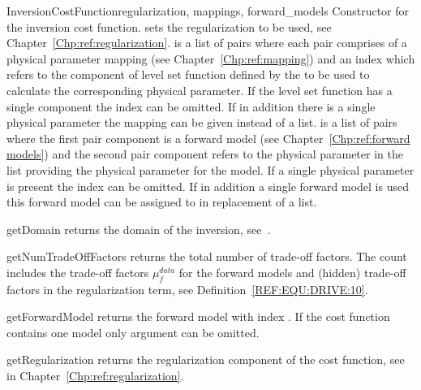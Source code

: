 \begin{classdesc}{InversionCostFunction}{regularization, mappings, forward_models}
Constructor for the inversion cost function.  sets the regularization to be used, see Chapter~\ref{Chp:ref:regularization}.
 is a list of pairs where each pair comprises of a 
physical parameter mapping (see Chapter~\ref{Chp:ref:mapping}) and an index which refers to the component of level set function
defined by the  to be used to calculate the corresponding physical parameter.
If the level set function has a single component the index can be omitted.
If in addition there is a single physical parameter the mapping can be given instead of a list.
 is a list of pairs where the first pair component is a
forward model (see Chapter~\ref{Chp:ref:forward models}) and the second pair
component refers to the physical parameter in the  list
providing the physical parameter for the model.
If a single physical parameter is present the index can be omitted.
If in addition a single forward model is used this forward model can be
assigned to  in replacement of a list.
\end{classdesc}

\begin{methoddesc}[InversionCostFunction]{getDomain}{}
returns the \escript domain of the inversion, see~\cite{ESCRIPT}.
\end{methoddesc}
        
\begin{methoddesc}[InversionCostFunction]{getNumTradeOffFactors}{}
returns the total number of trade-off factors.
The count includes the trade-off factors $\mu^{data}_{f}$ for the forward
models and (hidden) trade-off factors in the regularization term,
see Definition~\ref{REF:EQU:DRIVE:10}.
\end{methoddesc}

\begin{methoddesc}[InversionCostFunction]{getForwardModel}{}
returns the forward model with index .
If the cost function contains one model only argument  can be omitted.
\end{methoddesc}
        
\begin{methoddesc}[InversionCostFunction]{getRegularization}{}
returns the regularization component of the cost function, see  in Chapter~\ref{Chp:ref:regularization}.
\end{methoddesc}

